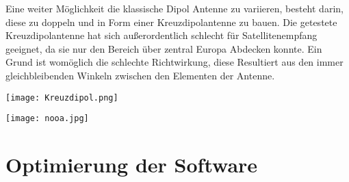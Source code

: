 \begin{multicols*}{2}
    Eine weiter Möglichkeit die klassische Dipol Antenne zu variieren, besteht darin, diese zu doppeln und in Form einer Kreuzdipolantenne zu bauen. Die getestete Kreuzdipolantenne hat sich außerordentlich schlecht für Satellitenempfang geeignet, da sie nur den Bereich über zentral Europa Abdecken konnte. Ein Grund ist womöglich die schlechte Richtwirkung, diese Resultiert aus den immer gleichbleibenden Winkeln zwischen den Elementen der Antenne. 

\end{multicols*}


\begin{center}
    \centering
    \texttt{[image: Kreuzdipol.png]}
\end{center}

\begin{center}
    \centering
    \texttt{[image: nooa.jpg]}
\end{center}



\section[]{Optimierung der Software}
